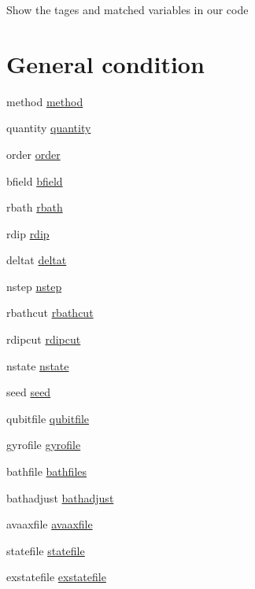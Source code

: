 Show the tages and matched variables in our code\hypertarget{TagVariable_IN_CONFIG}{}\section{General condition}\label{TagVariable_IN_CONFIG}

\begin{DoxyItemize}
\item method \hyperlink{structConfig_a73d927bf5bdb0f39d024b23dc66f0c1c}{method}
\item quantity \hyperlink{structConfig_a408cf9618ed41aefd0b0c323f57e0730}{quantity}
\item order \hyperlink{structConfig_a3a9071ea9a9409cefb8cbcea2184c879}{order}
\item bfield \hyperlink{structConfig_abf4c62b17ba762512fab9da0f1e193be}{bfield}
\item rbath \hyperlink{structConfig_a79389333cffeb4063cf1d39e89234c57}{rbath}
\item rdip \hyperlink{structConfig_af9d5e3a3b185555cbe04ad12733612b1}{rdip}
\item deltat \hyperlink{structConfig_a6539de558079f55df76dce79c4079b33}{deltat}
\item nstep \hyperlink{structConfig_acd1675410784e93a9c9866de0c64807e}{nstep}
\item rbathcut \hyperlink{structConfig_a2eeef76fa44792c24c3320ff6b4d19c8}{rbathcut}
\item rdipcut \hyperlink{structConfig_a39b6cf20220772b2326ddf423bf3a3f7}{rdipcut}
\item nstate \hyperlink{structConfig_a91b2aadf805896022127036ded259e79}{nstate}
\item seed \hyperlink{structConfig_a92ed038fd7676ed62640f59270a60545}{seed}
\item qubitfile \hyperlink{structConfig_a9f5ed3dfb6ae52627a94099cb837cfbf}{qubitfile}
\item gyrofile \hyperlink{structConfig_a735f7f25b0847d08468616025a27ffe5}{gyrofile}
\item bathfile \hyperlink{structConfig_afe80a72359e5fc90a5f0f16e9f1d357e}{bathfiles}
\item bathadjust \hyperlink{structConfig_a1ce641fcaac86656dde150e974ff5ff7}{bathadjust}
\item avaaxfile \hyperlink{structConfig_ae3244e507716ae5483bb32a2e4fef809}{avaaxfile}
\item statefile \hyperlink{structConfig_a7ce40e0c9e172e7b2e213101b154760b}{statefile}
\item exstatefile \hyperlink{structConfig_a70ec8756f364dc3d40201f951476137e}{exstatefile}

\end{DoxyItemize}
